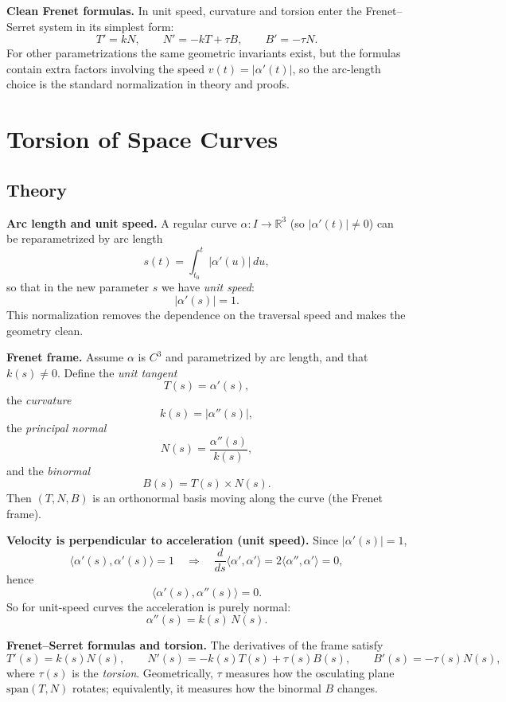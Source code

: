 \documentclass[12pt,a4paper]{article}
\theoremstyle{plain}
\theoremstyle{definition}      %
\begin{document}
\medskip
\noindent\textbf{Clean Frenet formulas.}
In unit speed, curvature and torsion enter the Frenet--Serret system in its simplest form:
\[
T'=kN,\qquad N'=-kT+\tau B,\qquad B'=-\tau N.
\]
For other parametrizations the same geometric invariants exist, but the formulas contain extra factors involving the
speed $v(t)=|\alpha'(t)|$, so the arc-length choice is the standard normalization in theory and proofs.

\section*{Torsion of Space Curves}

\subsection*{Theory}

\noindent\textbf{Arc length and unit speed.}
A regular curve $\alpha:I\to\mathbb{R}^3$ (so $|\alpha'(t)|\neq 0$) can be reparametrized by arc length
\[
s(t)=\int_{t_0}^{t}|\alpha'(u)|\,du,
\]
so that in the new parameter $s$ we have \emph{unit speed}:
\[
|\alpha'(s)|=1.
\]
This normalization removes the dependence on the traversal speed and makes the geometry clean.

\medskip
\noindent\textbf{Frenet frame.}
Assume $\alpha$ is $C^3$ and parametrized by arc length, and that $k(s)\neq 0$.
Define the \emph{unit tangent}
\[
T(s)=\alpha'(s),
\]
the \emph{curvature}
\[
k(s)=|\alpha''(s)|,
\]
the \emph{principal normal}
\[
N(s)=\frac{\alpha''(s)}{k(s)},
\]
and the \emph{binormal}
\[
B(s)=T(s)\times N(s).
\]
Then $(T,N,B)$ is an orthonormal basis moving along the curve (the Frenet frame).

\medskip
\noindent\textbf{Velocity is perpendicular to acceleration (unit speed).}
Since $|\alpha'(s)|=1$,
\[
\langle \alpha'(s),\alpha'(s)\rangle=1
\quad\Longrightarrow\quad
\frac{d}{ds}\langle \alpha',\alpha'\rangle
=2\langle \alpha'',\alpha'\rangle=0,
\]
hence
\[
\langle \alpha'(s),\alpha''(s)\rangle=0.
\]
So for unit-speed curves the acceleration is purely normal:
\[
\alpha''(s)=k(s)\,N(s).
\]

\medskip
\noindent\textbf{Frenet--Serret formulas and torsion.}
The derivatives of the frame satisfy
\[
T'(s)=k(s)N(s),\qquad
N'(s)=-k(s)T(s)+\tau(s)B(s),\qquad
B'(s)=-\tau(s)N(s),
\]
where $\tau(s)$ is the \emph{torsion}. Geometrically, $\tau$ measures how the osculating plane
$\mathrm{span}(T,N)$ rotates; equivalently, it measures how the binormal $B$ changes.
\end{document}
